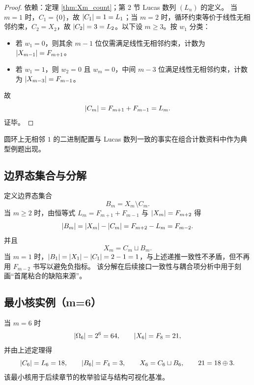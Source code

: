 \begin{proof}
\MathTag 依赖：定理 \ref{thm:Xm_count}；第 2 节 Lucas 数列 $(L_n)$ 的定义。
当 $m=1$ 时，$C_1=\{0\}$，故 $\left\lvert C_1\right\rvert=1=L_1$；当 $m=2$ 时，循环约束等价于线性无相邻约束，$C_2=X_2$，故 $\left\lvert C_2\right\rvert=3=L_2$。以下设 $m\ge 3$。按 $w_1$ 分类：
\begin{itemize}
  \item 若 $w_1=0$，则其余 $m-1$ 位仅需满足线性无相邻约束，计数为 $\left\lvert X_{m-1}\right\rvert=F_{m+1}$。
  \item 若 $w_1=1$，则 $w_2=0$ 且 $w_m=0$，中间 $m-3$ 位满足线性无相邻约束，计数为 $\left\lvert X_{m-3}\right\rvert=F_{m-1}$。
\end{itemize}
故
$$
\left\lvert C_m\right\rvert=F_{m+1}+F_{m-1}=L_m.
$$
证毕。
\end{proof}

圆环上无相邻 $1$ 的二进制配置与 Lucas 数列一致的事实在组合计数资料中作为典型例题出现。\cite{cameron_notes_on_counting}

\subsection{边界态集合与分解}

定义边界态集合
$$
B_m=X_m\setminus C_m.
$$
当 $m\ge 2$ 时，由恒等式 $L_m=F_{m+1}+F_{m-1}$ 与 $\left\lvert X_m\right\rvert=F_{m+2}$ 得
$$
\left\lvert B_m\right\rvert=\left\lvert X_m\right\rvert-\left\lvert C_m\right\rvert=F_{m+2}-L_m=F_{m-2}.
$$
并且
$$
X_m=C_m\sqcup B_m.
$$
当 $m=1$ 时，$\left\lvert B_1\right\rvert=\left\lvert X_1\right\rvert-\left\lvert C_1\right\rvert=2-1=1$，与上述递推一致性不矛盾，但不再用 $F_{m-2}$ 书写以避免负指标。
该分解在后续接口一致性与耦合项分析中用于刻画“首尾粘合的缺陷来源”。

\subsection{最小核实例（m=6）}

当 $m=6$ 时
$$
\left\lvert \Omega_6\right\rvert=2^6=64,\qquad \left\lvert X_6\right\rvert=F_8=21,
$$
并由上述定理得
$$
\left\lvert C_6\right\rvert=L_6=18,\qquad \left\lvert B_6\right\rvert=F_4=3,
\qquad X_6=C_6\sqcup B_6,\qquad 21=18\oplus 3.
$$
该最小核用于后续章节的枚举验证与结构可视化基准。
